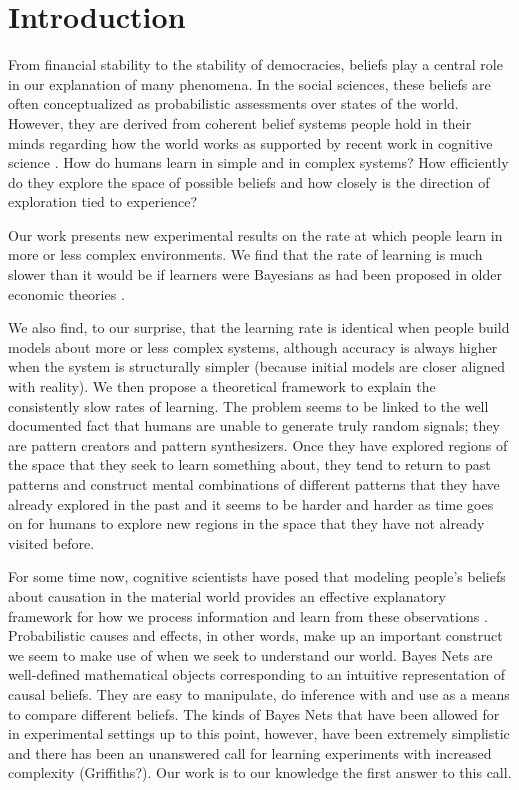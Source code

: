\section{Introduction}
From financial stability to the stability of democracies, beliefs play a central role in our explanation of many phenomena. In the social sciences, these beliefs are often conceptualized as probabilistic assessments over states of the world.  However, they are derived from coherent belief systems people hold in their minds regarding how the world works as supported by recent work in cognitive science \cite{lombrozo2006structure, anderson1990cognitive}.  How do humans learn in simple and in complex systems?  How efficiently do they explore the space of possible beliefs and how closely is the direction of exploration tied to experience?  

Our work presents new experimental results on the rate at which people learn in more or less complex environments. We find that the rate of learning is much slower than it would be if learners were Bayesians as had been proposed in older economic theories \cite{Boyer84, Prescott72, Rothschild74, McLennan84, Mirman84, Easley89, Kiefer89}.

 We also find, to our surprise, that the learning rate is identical when people build models about more or less complex systems, although accuracy is always higher when the system is structurally simpler (because initial models are closer aligned with reality). We then propose a theoretical framework to explain the consistently slow rates of learning.  The problem seems to be linked to the well documented fact that humans are unable to generate truly random signals; they are pattern creators and pattern synthesizers.  Once they have explored regions of the space that they seek to learn something about, they tend to return to past patterns and construct mental combinations of different patterns that they have already explored in the past and it seems to be harder and harder as time goes on for humans to explore new regions in the space that they have not already visited before.

For some time now, cognitive scientists have posed that modeling people's beliefs about causation in the material world provides an effective explanatory framework for how we process information and learn from these observations \cite{Griffiths2008}.  Probabilistic causes and effects, in other words, make up an important construct we seem to make use of when we seek to understand our world.  Bayes Nets are well-defined mathematical objects corresponding to an intuitive representation of causal beliefs.  They are easy to manipulate, do inference with and use as a means to compare different beliefs.  The kinds of Bayes Nets that have been allowed for in experimental settings up to this point, however, have been extremely simplistic and there has been an unanswered call for learning experiments with increased complexity (Griffiths?).  Our work is to our knowledge the first answer to this call.  

